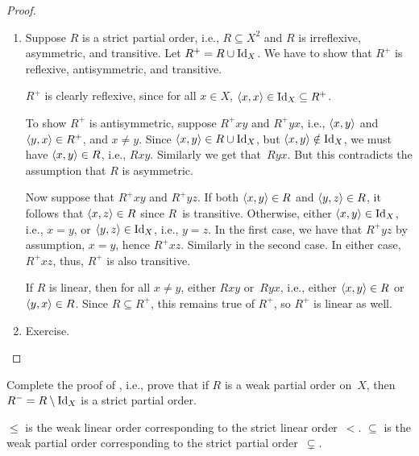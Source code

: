 \documentclass[../../../include/open-logic-section]{subfiles}
\begin{document}
\begin{proof}
  \begin{enumerate}
    \item Suppose $R$ is a strict partial order, i.e., $R \subseteq
      X^2$ and $R$ is irreflexive, asymmetric, and transitive. Let $R^+
      = R \cup \mathord{\mathrm{Id}_{X}}$. We have to show that $R^+$ is reflexive,
      antisymmetric, and transitive.

      $R^+$ is clearly reflexive, since for all $x \in X$, $\langle x,
        x \rangle \in \mathord{\mathrm{Id}_{X}} \subseteq R^+$.

      To show $R^+$ is antisymmetric, suppose $R^+xy$ and $R^+yx$,
      i.e., $\langle x,y \rangle$ and $\langle y, x \rangle \in R^+$, and $x \neq y$.
      Since $\langle x,y \rangle \in R \cup \mathord{\mathrm{Id}_{X}}$, but $\langle x, y \rangle \notin
      \mathord{\mathrm{Id}_{X}}$, we must have $\langle x, y \rangle \in R$, i.e.,
      $Rxy$. Similarly we get that~$Ryx$. But this contradicts the
      assumption that $R$ is asymmetric.

      Now suppose that $R^+xy$ and $R^+yz$. If both $\langle x, y \rangle \in
      R$ and $\langle y,z \rangle \in R$, it follows that $\langle x, z \rangle \in R$
      since $R$~is transitive. Otherwise, either $\langle x, y \rangle \in
      \mathord{\mathrm{Id}_{X}}$, i.e., $x = y$, or $\langle y, z \rangle \in \mathord{\mathrm{Id}_{X}}$, i.e., $y =
      z$. In the first case, we have that $R^+yz$ by assumption, $x =
      y$, hence $R^+xz$. Similarly in the second case. In either case, $R^+xz$,
      thus, $R^+$ is also transitive.

      If $R$ is linear, then for all $x \neq y$, either $Rxy$
      or~$Ryx$, i.e., either $\langle x, y \rangle \in R$ or $\langle y, x \rangle \in
      R$. Since $R \subseteq R^+$, this remains true of $R^+$, so
      $R^+$ is linear as well.
    \item Exercise.
  \end{enumerate}
\end{proof}

\begin{prob}
  Complete the proof of , i.e.,
  prove that if $R$ is a weak partial order on~$X$, then $R^- =
  R \setminus \mathord{\mathrm{Id}_{X}}$ is a strict partial order. 
\end{prob}


\begin{ex}
$\le$ is the weak linear order corresponding to the strict linear
  order~$<$. $\subseteq$ is the weak partial order corresponding to the
  strict partial order~$\subsetneq$.
\end{ex}
\end{document}
